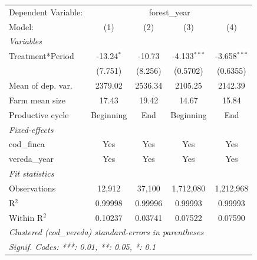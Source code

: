 
\begingroup
\centering
\begin{tabular}{lcccc}
   \tabularnewline \midrule \midrule
   Dependent Variable: & \multicolumn{4}{c}{forest\_year}\\
   Model:            & (1)          & (2)     & (3)            & (4)\\  
   \midrule
   \emph{Variables}\\
   Treatment*Period  & -13.24$^{*}$ & -10.73  & -4.133$^{***}$ & -3.658$^{***}$\\   
                     & (7.751)      & (8.256) & (0.5702)       & (0.6355)\\   
   Mean of dep. var. & 2379.02      & 2536.34 & 2105.25        & 2142.39\\  
   Farm mean size    & 17.43        & 19.42   & 14.67          & 15.84\\  
   Productive cycle  & Beginning    & End     & Beginning      & End\\  
   \midrule
   \emph{Fixed-effects}\\
   cod\_finca        & Yes          & Yes     & Yes            & Yes\\  
   vereda\_year      & Yes          & Yes     & Yes            & Yes\\  
   \midrule
   \emph{Fit statistics}\\
   Observations      & 12,912       & 37,100  & 1,712,080      & 1,212,968\\  
   R$^2$             & 0.99998      & 0.99996 & 0.99993        & 0.99993\\  
   Within R$^2$      & 0.10237      & 0.03741 & 0.07522        & 0.07590\\  
   \midrule \midrule
   \multicolumn{5}{l}{\emph{Clustered (cod\_vereda) standard-errors in parentheses}}\\
   \multicolumn{5}{l}{\emph{Signif. Codes: ***: 0.01, **: 0.05, *: 0.1}}\\
\end{tabular}
\par\endgroup



